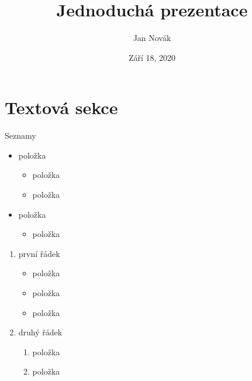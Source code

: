 \documentclass{beamer}
\author{Jan Novák}
\title{Jednoduchá prezentace}
\date{Září 18, 2020} %
\begin{document}
\maketitle



\section{Textová sekce}
\begin{frame}[fragile, shrink=0]{Seznamy}



	\begin{itemize}
		\item položka
		      \begin{itemize}
			      \item položka
			      \item položka
		      \end{itemize}
		\item položka
		      \begin{itemize}
			      \item položka
		      \end{itemize}
	\end{itemize}
	
		\begin{enumerate}
			\item první řádek
			\begin{itemize}
			      \item položka
			      \item položka
			      \item položka
		      \end{itemize}
			\item druhý řádek
			  \begin{enumerate}
			      \item položka
			      \item položka
		      \end{enumerate}
		\end{enumerate}
	
\end{frame}
\end{document}
